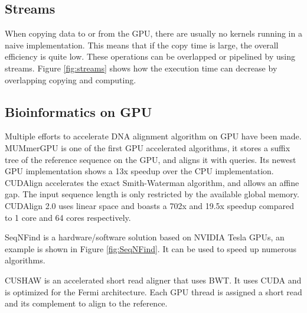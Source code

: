 \documentclass[../main/thesis.tex]{subfiles}
\begin{document}


\subsection{Streams}
When copying data to or from the GPU, there are usually no kernels running in a naive implementation.
This means that if the copy time is large, the overall efficiency is quite low.
These operations can be overlapped or pipelined by using streams. Figure \ref{fig:streams} shows how the execution time can decrease by overlapping copying and computing.



\subsection{Bioinformatics on GPU}


Multiple efforts to accelerate DNA alignment algorithm on GPU have been made.
MUMmerGPU \cite{MUMmerGPU}\cite{MUMmerGPU2} is one of the first GPU accelerated algorithms, it stores a suffix tree of the reference sequence on the GPU, and aligns it with queries.
Its newest GPU implementation shows a 13x speedup over the CPU implementation.
CUDAlign \cite{CUDAlign} accelerates the exact Smith-Waterman algorithm, and allows an affine gap.
The input sequence length is only restricted by the available global memory.
CUDAlign 2.0 \cite{CUDAlign2} uses linear space and boasts a 702x and 19.5x speedup compared to 1 core and 64 cores respectively.

SeqNFind \cite{SeqNFind} is a hardware/software solution based on NVIDIA Tesla GPUs, an example is shown in Figure \ref{fig:SeqNFind}.
It can be used to speed up numerous algorithms.


CUSHAW \cite{cushaw} is an accelerated short read aligner that uses BWT.
It uses CUDA and is optimized for the Fermi architecture.
Each GPU thread is assigned a short read and its complement to align to the reference.
\end{document}
